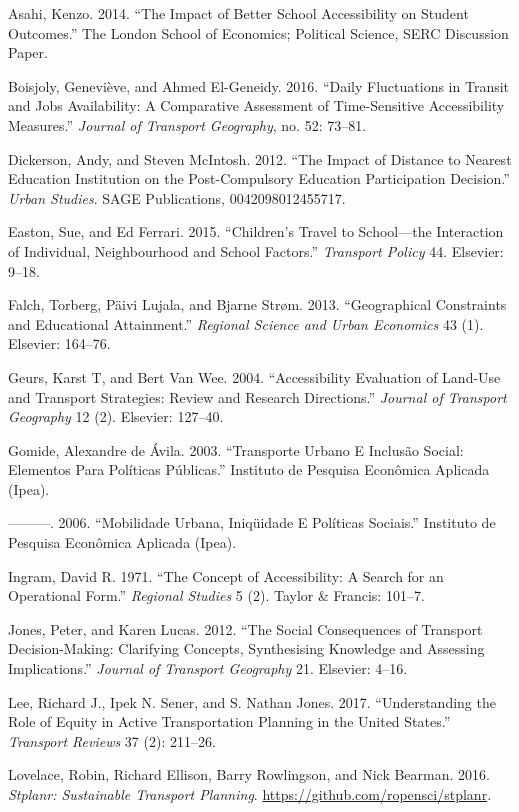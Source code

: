 \documentclass[3p,authoryear,preprint,review,12pt]{elsarticle}
\begin{document}
Asahi, Kenzo. 2014. ``The Impact of Better School Accessibility on
Student Outcomes.'' The London School of Economics; Political Science,
SERC Discussion Paper.

Boisjoly, Genevi{è}ve, and Ahmed El-Geneidy. 2016. ``Daily Fluctuations
in Transit and Jobs Availability: A Comparative Assessment of
Time-Sensitive Accessibility Measures.'' \emph{Journal of Transport
Geography}, no. 52: 73--81.

Dickerson, Andy, and Steven McIntosh. 2012. ``The Impact of Distance to
Nearest Education Institution on the Post-Compulsory Education
Participation Decision.'' \emph{Urban Studies}. SAGE Publications,
0042098012455717.

Easton, Sue, and Ed Ferrari. 2015. ``Children's Travel to School---the
Interaction of Individual, Neighbourhood and School Factors.''
\emph{Transport Policy} 44. Elsevier: 9--18.

Falch, Torberg, P{ä}ivi Lujala, and Bjarne Str{ø}m. 2013. ``Geographical
Constraints and Educational Attainment.'' \emph{Regional Science and
Urban Economics} 43 (1). Elsevier: 164--76.

Geurs, Karst T, and Bert Van Wee. 2004. ``Accessibility Evaluation of
Land-Use and Transport Strategies: Review and Research Directions.''
\emph{Journal of Transport Geography} 12 (2). Elsevier: 127--40.

Gomide, Alexandre de {Á}vila. 2003. ``Transporte Urbano E Inclusão
Social: Elementos Para Políticas Públicas.'' Instituto de Pesquisa
Econômica Aplicada (Ipea).

---------. 2006. ``Mobilidade Urbana, Iniqüidade E Políticas Sociais.''
Instituto de Pesquisa Econômica Aplicada (Ipea).

Ingram, David R. 1971. ``The Concept of Accessibility: A Search for an
Operational Form.'' \emph{Regional Studies} 5 (2). Taylor \& Francis:
101--7.

Jones, Peter, and Karen Lucas. 2012. ``The Social Consequences of
Transport Decision-Making: Clarifying Concepts, Synthesising Knowledge
and Assessing Implications.'' \emph{Journal of Transport Geography} 21.
Elsevier: 4--16.

Lee, Richard J., Ipek N. Sener, and S. Nathan Jones. 2017. ``Understanding the Role of Equity in Active Transportation Planning in the United States.'' \emph{Transport Reviews} 37 (2): 211–26.

Lovelace, Robin, Richard Ellison, Barry Rowlingson, and Nick Bearman.
2016. \emph{Stplanr: Sustainable Transport Planning}.
\url{https://github.com/ropensci/stplanr}.
\end{document}
